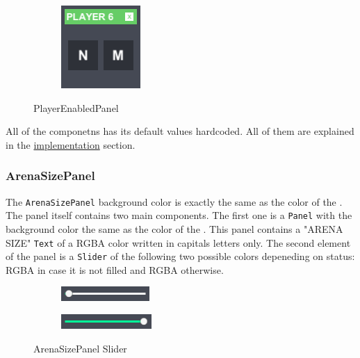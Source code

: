 \begin{figure}[h!]
\begin{subfigure}{0.195\textwidth}
	\end{subfigure}
	\begin{subfigure}{0.195\textwidth}
		\centering
		\includegraphics[scale=1, frame]{gui-imgs/player6enabledpanel}
	\end{subfigure}
	\caption{PlayerEnabledPanel}
\end{figure}

\noindent All of the componetns has its default values hardcoded. All of them are explained in the \hyperref[gui-implementation]{implementation} section.

\subsubsection*{ArenaSizePanel}\label{gui-arenasizepanel}
\noindent The \verb+ArenaSizePanel+ background color is exactly the same as the color of the . The panel itself contains two main components. The first one is a \verb+Panel+ with the background color the same as the color of the . This panel contains a "ARENA SIZE" \verb+Text+ of a RGBA  color written in capitals letters only. The second element of the panel is a \verb+Slider+ of the following two possible colors depeneding on status:  RGBA in case it is not filled and  RGBA otherwise.

\begin{figure}[h] 
	\centering
	\begin{subfigure}{0.22\textwidth}
		\centering
		\includegraphics[scale=1, frame]{gui-imgs/slider0}
	\end{subfigure}
	\begin{subfigure}{0.22\textwidth}
		\centering
		\includegraphics[scale=1, frame]{gui-imgs/slider1}
	\end{subfigure}
	\caption{ArenaSizePanel Slider}
\end{figure}

